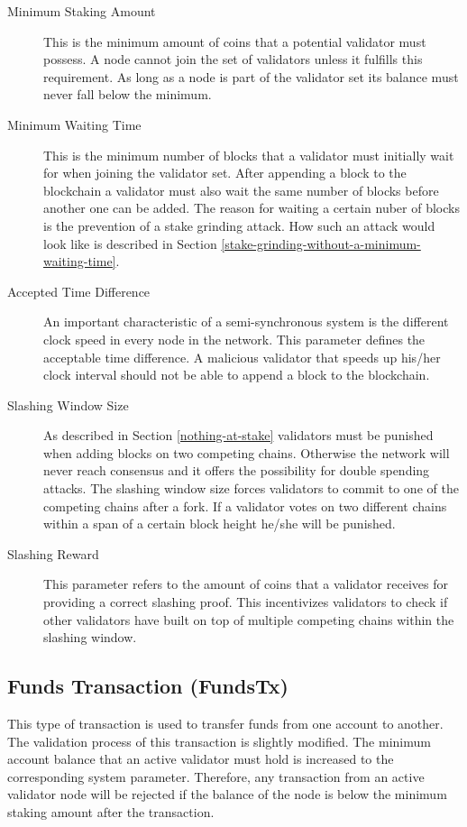 \begin{description}
	\item[Minimum Staking Amount] This is the minimum amount of coins that a potential validator must possess. A node cannot join the set of validators unless it fulfills this requirement. As long as a node is part of the validator set its balance must never fall below the minimum.
	\item[Minimum Waiting Time] This is the minimum number of blocks that a validator must initially wait for when joining the validator set. After appending a block to the blockchain a validator must also wait the same number of blocks before another one can be added. The reason for waiting a certain nuber of blocks is the prevention of a stake grinding attack. How such an attack would look like is described in Section \ref{stake-grinding-without-a-minimum-waiting-time}.
	\item[Accepted Time Difference] An important characteristic of a semi-synchronous system is the different clock speed in every node in the network. This parameter defines the acceptable time difference. A malicious validator that speeds up his/her clock interval should not be able to append a block to the blockchain. 
	\item[Slashing Window Size] As described in Section \ref{nothing-at-stake} validators must be punished when adding blocks on two competing chains. Otherwise the network will never reach consensus and it offers the possibility for double spending attacks. The slashing window size forces validators to commit to one of the competing chains after a fork. If a validator votes on two different chains within a span of a certain block height he/she will be punished. 
	\item[Slashing Reward] This parameter refers to the amount of coins that a validator receives for providing a correct slashing proof. This incentivizes validators to check if other validators have built on top of multiple competing chains within the slashing window. 
\end{description}

\subsection{Funds Transaction (FundsTx)}\label{funds-transaction}
This type of transaction is used to transfer funds from one account to another. The validation process of this transaction is slightly modified. The minimum account balance that an active validator must hold is increased to the corresponding system parameter. Therefore, any transaction from an active validator node will be rejected if the balance of the node is below the minimum staking amount after the transaction.

